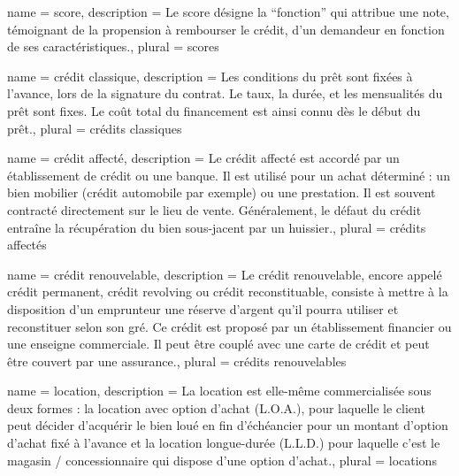 








{
	name = score,
	description = {Le score désigne la ``fonction'' qui attribue une note, témoignant de la propension à rembourser le crédit, d'un demandeur en fonction de ses caractéristiques.},
	plural = scores
}



{
	name = crédit classique,
	description = {Les conditions du prêt sont fixées à l’avance, lors de la signature du contrat. Le taux, la durée, et les mensualités du prêt sont fixes. Le coût total du financement est ainsi connu dès le début du prêt.},
	plural = crédits classiques
}

{
	name = crédit affecté,
	description = {Le crédit affecté est accordé par un établissement de crédit ou une banque. Il est utilisé pour un achat déterminé : un bien mobilier (crédit automobile par exemple) ou une prestation. Il est souvent contracté directement sur le lieu de vente. Généralement, le défaut du crédit entraîne la récupération du bien sous-jacent par un huissier.},
	plural = crédits affectés
}

{
	name = crédit renouvelable,
	description = {Le crédit renouvelable, encore appelé crédit permanent, crédit revolving ou crédit reconstituable, consiste à mettre à la disposition d'un emprunteur une réserve d'argent qu'il pourra utiliser et reconstituer selon son gré. Ce crédit est proposé par un établissement financier ou une enseigne commerciale. Il peut être couplé avec une carte de crédit et peut être couvert par une assurance.},
	plural = crédits renouvelables
}

{
	name = location,
	description = {La location est elle-même commercialisée sous deux formes : la location avec option d'achat (L.O.A.), pour laquelle le client peut décider d'acquérir le bien loué en fin d'échéancier pour un montant d'option d'achat fixé à l'avance et la location longue-durée (L.L.D.) pour laquelle c'est le magasin / concessionnaire qui dispose d'une option d'achat.},
	plural = locations
}

